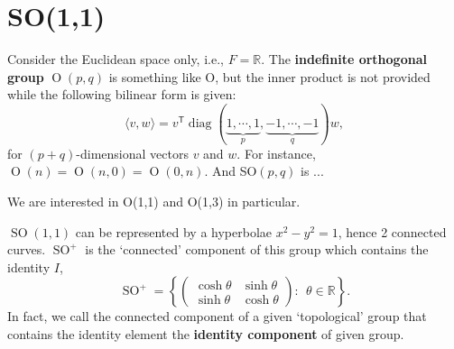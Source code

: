 \section{SO(1,1)}
\begin{defn} Consider the Euclidean space only, i.e.,   $F=\mathbb R$.
The \textbf{indefinite orthogonal group} $\operatorname{O}(p, q)$ is something like O, but the inner product is not provided while the following bilinear form is given: $$\langle v, w\rangle = v^\mathsf T \operatorname{diag}(\underbrace{1, \cdots, 1}_{p}, \underbrace{-1, \cdots, -1}_{q}) w,$$
 for $(p+q)$-dimensional vectors $v$ and $w$. For instance, $\operatorname{O}(n) = \operatorname{O}(n,0) = \operatorname{O}(0,n).$
And SO$(p,q)$ is ...
\end{defn}
We are interested in O(1,1) and O(1,3) in particular.
\begin{prop}
$\operatorname{SO}(1,1)$ can be represented by a hyperbolae $x^2 - y^2 = 1$, hence 2 connected curves. $\operatorname{SO}^+$ is the `connected' component of this group which contains the identity $I$, $$\operatorname{SO}^+ = \left\{ \begin{pmatrix}\cosh \theta & \sinh \theta \\ \sinh \theta & \cosh \theta\end{pmatrix}:~~ \theta\in\mathbb R \right\}.$$ In fact, we call the connected component of a given `topological' group that contains the identity element the \textbf{identity component} of given group.
\end{prop}
\begin{center}

\end{center}
